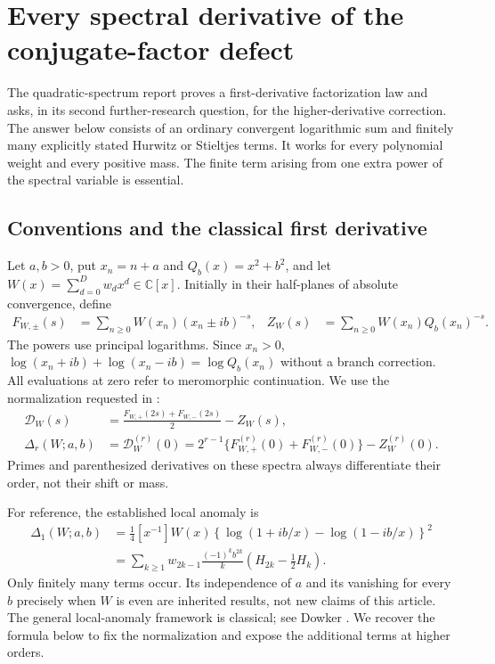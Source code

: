 \section{Every spectral derivative of the conjugate-factor defect}
\label{sd:section}

The quadratic-spectrum report \cite{QSpec} proves a first-derivative
factorization law and asks, in its second further-research question, for
the higher-derivative correction.  The answer below consists of an
ordinary convergent logarithmic sum and finitely many explicitly stated
Hurwitz or Stieltjes terms.  It works for every polynomial weight and
every positive mass.  The finite term arising from one extra power of
the spectral variable is essential.

\subsection{Conventions and the classical first derivative}

Let $a,b>0$, put $x_n=n+a$ and $Q_b(x)=x^2+b^2$, and let
$W(x)=\sum_{d=0}^{D}w_dx^d\in\mathbb C[x]$.  Initially in their
half-planes of absolute convergence, define
\begin{align}
 F_{W,\pm}(s)&=\sum_{n\ge0}W(x_n)(x_n\pm ib)^{-s},
 &Z_W(s)&=\sum_{n\ge0}W(x_n)Q_b(x_n)^{-s}.
 \label{sd:def:spectra}
\end{align}
The powers use principal logarithms.  Since $x_n>0$,
$\log(x_n+ib)+\log(x_n-ib)=\log Q_b(x_n)$ without a branch correction.
All evaluations at zero refer to meromorphic continuation.  We use the
normalization requested in \cite{QSpec}:
\begin{align}
 \mathscr D_W(s)&=\frac{F_{W,+}(2s)+F_{W,-}(2s)}2-Z_W(s),
 \label{sd:def:difference}\\
 \Delta_r(W;a,b)&=\mathscr D_W^{(r)}(0)
 =2^{r-1}\{F_{W,+}^{(r)}(0)+F_{W,-}^{(r)}(0)\}-Z_W^{(r)}(0).
 \label{sd:def:defect}
\end{align}
Primes and parenthesized derivatives on these spectra always
differentiate their order, not their shift or mass.

For reference, the established local anomaly is
\begin{align}
 \Delta_1(W;a,b)
 &=\frac14[x^{-1}]W(x)
       \left\{\log(1+ib/x)-\log(1-ib/x)\right\}^{2}
       \label{sd:eq:first-residue}\\
 &=\sum_{k\ge1}w_{2k-1}\frac{(-1)^kb^{2k}}{k}
       \left(H_{2k}-\frac12H_k\right).
       \label{sd:eq:first-harmonic}
\end{align}
Only finitely many terms occur.  Its independence of $a$ and its
vanishing for every $b$ precisely when $W$ is even are inherited
results, not new claims of this article.  The general local-anomaly
framework is classical; see Dowker \cite{Dowker}.  We recover the formula
below to fix the normalization and expose the additional terms at
higher orders.


